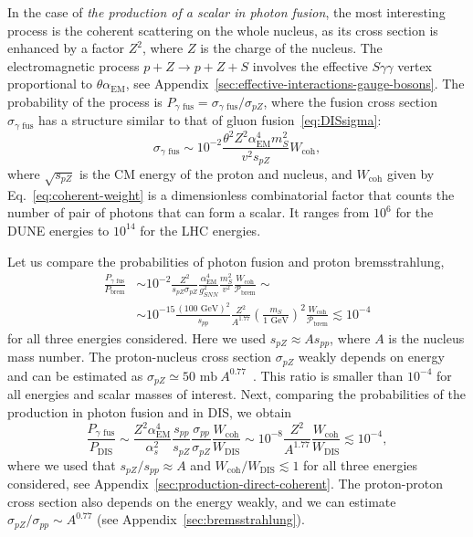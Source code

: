 \documentclass[a4paper,12pt,dvipsnames,usernames]{article}
\begin{document}
In the case of \emph{the production of a scalar in photon fusion}, the most interesting process is the coherent scattering on the whole nucleus, as its cross section is enhanced by a factor $Z^2$, where $Z$ is the charge of the nucleus. 
The electromagnetic process $p+Z \to p+Z+S$ involves the effective $S\gamma\gamma$ vertex proportional to $\theta \alpha_{\text{EM}}$, see Appendix~\ref{sec:effective-interactions-gauge-bosons}. The probability of the process is $P_{\gamma\text{ fus}} = \sigma_{\gamma\text{ fus}}/\sigma_{pZ}$, where the fusion cross section $\sigma_{\gamma\text{ fus}}$ has a structure similar to that of gluon fusion~\eqref{eq:DISsigma}:
\begin{equation}
    \sigma_{\gamma\text{ fus}} \sim 10^{-2} \frac{\theta^2 Z^{2}\alpha_{\text{EM}}^{4}m_{S}^{2}}{v^{2}s_{pZ}} W_{\text{coh}},
\end{equation}
where $\sqrt{s_{pZ}}$ is the CM energy of the proton and nucleus, and $W_{\text{coh}}$ given by Eq.~\eqref{eq:coherent-weight} is a dimensionless combinatorial factor that counts the number of pair of photons that can form a scalar. It ranges from $10^{6}$ for the DUNE energies to $10^{14}$ for the LHC energies.

Let us compare the probabilities of  photon fusion and  proton bremsstrahlung,
\begin{align}
    \frac{P_{\gamma\text{ fus}}}{P_{\text{brem}}} &\sim 10^{-2}\frac{Z^{2}}{s_{pZ}\sigma_{pZ}} 
    \frac{\alpha_{\text{EM}}^{4}}{g_{SNN}^{2}} 
    \frac{m_{S}^{2}}{v^{2}}
    \frac{W_{\text{coh}}}{\mathcal{P}_{\text{brem}}} 
    \sim \\ &\sim 
    10^{-15}\frac{(100\text{ GeV})^{2}}{s_{pp}}\frac{Z^{2}}{A^{1.77}}\left(\frac{m_{S}}{1\text{ GeV}}\right)^{2}\frac{W_{\text{coh}}}{\mathcal{P}_{\text{brem}}} \lesssim 10^{-4}
\end{align}
for all three energies considered. Here we used $s_{pZ}\approx A s_{pp}$, where $A$ is the nucleus mass number. The proton-nucleus cross section $\sigma_{pZ}$ weakly depends on energy and can be estimated  as $\sigma_{pZ} \simeq 50\text{ mb}\  A^{0.77}$~\cite{Tanabashi:2018oca,Carvalho:2003pza}. This ratio is smaller than $10^{-4}$ for all energies and scalar masses of interest. Next, comparing the probabilities of the production in photon fusion and in DIS, we obtain
\begin{equation}
    \frac{P_{\gamma 
\text{ fus}}}{P_{\text{DIS}}}\sim \frac{Z^2 \alpha_{\text{EM}}^4}{\alpha_s^2} \frac{s_{pp}}{s_{pZ}} \frac{\sigma_{pp}}{\sigma_{pZ}} \frac{W_{\text{coh}}}{W_{\text{DIS}}} \sim 10^{-8}\frac{Z^{2}}{A^{1.77}}\frac{W_{\text{coh}}}{W_{\text{DIS}}} \lesssim 10^{-4},
\end{equation}
where we used that $s_{pZ}/s_{pp}\approx A$ and $W_{\text{coh}}/W_{\text{DIS}} \lesssim 1$ for all three energies considered, see Appendix~\ref{sec:production-direct-coherent}. The proton-proton cross section also  depends on the energy  weakly,
and we can estimate   $\sigma_{pZ}/\sigma_{pp}\sim A^{0.77}$
(see Appendix~\ref{sec:bremsstrahlung}).
\end{document}
